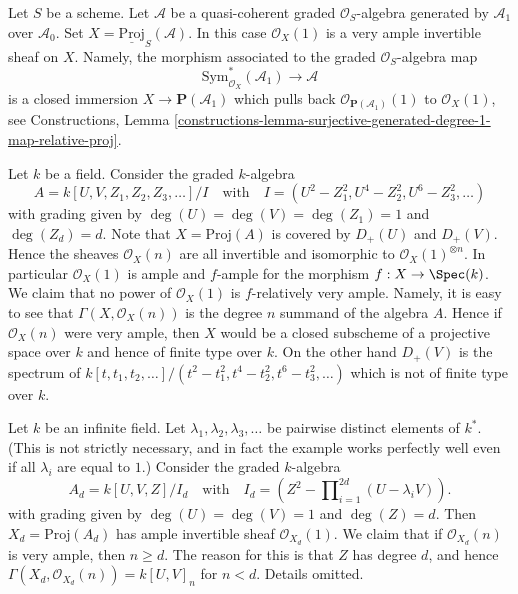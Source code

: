 \begin{example}
\label{example-very-ample}
Let $S$ be a scheme. Let $\mathcal{A}$ be a quasi-coherent graded
$\mathcal{O}_S$-algebra generated by $\mathcal{A}_1$ over $\mathcal{A}_0$.
Set $X = \underline{\text{Proj}}_S(\mathcal{A})$. In this case
$\mathcal{O}_X(1)$ is a very ample invertible sheaf on $X$. Namely,
the morphism associated to the graded $\mathcal{O}_S$-algebra map
$$
\text{Sym}_{\mathcal{O}_X}^*(\mathcal{A}_1)
\longrightarrow
\mathcal{A}
$$
is a closed immersion $X \to \mathbf{P}(\mathcal{A}_1)$ which pulls back
$\mathcal{O}_{\mathbf{P}(\mathcal{A}_1)}(1)$ to $\mathcal{O}_X(1)$, see
Constructions, Lemma
\ref{constructions-lemma-surjective-generated-degree-1-map-relative-proj}.
\end{example}

\begin{example}
\label{example-not-finite-type-proj}
Let $k$ be a field.
Consider the graded $k$-algebra
$$
A = k[U, V, Z_1, Z_2, Z_3, \ldots]/I
\quad
\text{with}
\quad
I = (U^2 - Z_1^2, U^4 - Z_2^2, U^6 - Z_3^2, \ldots)
$$
with grading given by $\deg(U) = \deg(V) = \deg(Z_1) = 1$
and $\deg(Z_d) = d$.
Note that $X = \text{Proj}(A)$ is covered by $D_{+}(U)$ and
$D_{+}(V)$. Hence the sheaves $\mathcal{O}_X(n)$ are all
invertible and isomorphic to $\mathcal{O}_X(1)^{\otimes n}$.
In particular $\mathcal{O}_X(1)$ is ample and $f$-ample
for the morphism $f : X \to \Spec(k)$.
We claim that no power of $\mathcal{O}_X(1)$ is $f$-relatively very ample.
Namely, it is easy to see that $\Gamma(X, \mathcal{O}_X(n))$
is the degree $n$ summand of the algebra $A$. Hence if $\mathcal{O}_X(n)$
were very ample, then $X$ would be a closed subscheme of a projective
space over $k$ and hence of finite type over $k$. On the other hand
$D_{+}(V)$ is the spectrum of
$k[t, t_1, t_2, \ldots]/(t^2 - t_1^2, t^4 - t_2^2, t^6 - t_3^2, \ldots)$
which is not of finite type over $k$.
\end{example}

\begin{example}
\label{example-not-bounded}
Let $k$ be an infinite field. Let $\lambda_1, \lambda_2, \lambda_3, \ldots$
be pairwise distinct elements of $k^*$. (This is not strictly necessary,
and in fact the example works perfectly well even if all $\lambda_i$
are equal to $1$.)
Consider the graded $k$-algebra
$$
A_d = k[U, V, Z]/I_d
\quad
\text{with}
\quad
I_d = (Z^2 - \prod\nolimits_{i = 1}^{2d} (U - \lambda_i V)).
$$
with grading given by $\deg(U) = \deg(V) = 1$ and $\deg(Z) = d$.
Then $X_d = \text{Proj}(A_d)$ has ample invertible sheaf
$\mathcal{O}_{X_d}(1)$. We claim that if $\mathcal{O}_{X_d}(n)$
is very ample, then $n \geq d$. The reason for this is that $Z$
has degree $d$, and hence $\Gamma(X_d, \mathcal{O}_{X_d}(n)) =
k[U, V]_n$ for $n < d$. Details omitted.
\end{example}

